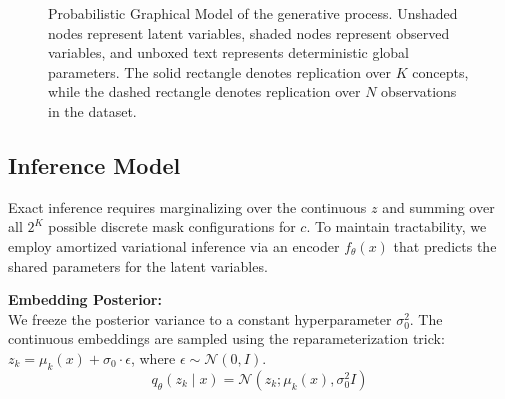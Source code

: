\documentclass[11pt, a4paper]{article}
\begin{document}
\begin{figure}[htbp]
    \centering
    \caption{Probabilistic Graphical Model of the generative process. Unshaded nodes represent latent variables, shaded nodes represent observed variables, and unboxed text represents deterministic global parameters. The solid rectangle denotes replication over $K$ concepts, while the dashed rectangle denotes replication over $N$ observations in the dataset.}
    \label{fig:pgm}
\end{figure}

\subsection{Inference Model}

Exact inference requires marginalizing over the continuous $z$ and summing over all $2^K$ possible discrete mask configurations for $c$. To maintain tractability, we employ amortized variational inference via an encoder $f_\theta(x)$ that predicts the shared parameters for the latent variables.

\textbf{Embedding Posterior:} \\
We freeze the posterior variance to a constant hyperparameter $\sigma_0^2$. The continuous embeddings are sampled using the reparameterization trick: $z_k = \mu_k(x) + \sigma_0 \cdot \epsilon$, where $\epsilon \sim \mathcal{N}(0, I)$.
\[
q_\theta(z_k \mid x) = \mathcal{N}(z_k; \mu_k(x), \sigma_0^2 I)
\]
\end{document}
